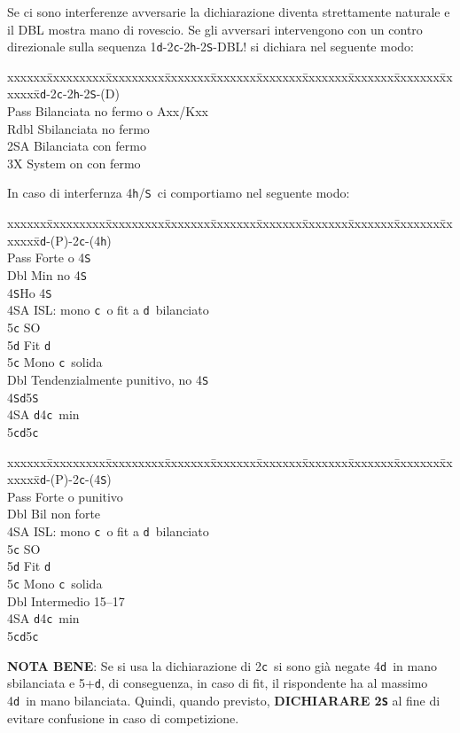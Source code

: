 \documentclass[a4paper,italian]{article}
\newcommand{\BS}{\small{\texttt{S}}}
\newcommand{\BC}{\small{\texttt{c}}}
\newcommand{\BD}{\small{\texttt{d}}}
\newcommand{\BH}{\small{\texttt{h}}}
\newenvironment{bidtable}
{\begin{tabbing}

    xxxxxx\=xxxxxxxxx\=xxxxxxxxx\=xxxxxxx\=xxxxxxx\=xxxxxxx\=xxxxxxx\=xxxxxxx\=xxxxxxx\=xxxxxxx\=\kill}
{\end{tabbing} }%
\newenvironment{attenzione}[1]
{\begin{tcolorbox}[colframe=red!80!white,title=#1]}
    {
\end{tcolorbox} }%
\begin{document}
\bigbreak
\begin{attenzione}{Interferenze}
    Se ci sono interferenze avversarie la dichiarazione diventa strettamente naturale e il DBL mostra mano di rovescio. Se gli avversari intervengono con un contro direzionale sulla sequenza 1\BD -2\BC -2\BH -2\BS -DBL! si dichiara nel seguente modo:
    \bigbreak
    \begin{bidtable}
        1\BD-2\BC-2\BH-2\BS-(D)\+\\
        Pass \> Bilanciata no fermo o Axx/Kxx\\
        Rdbl \> Sbilanciata no fermo\\
        2\small{SA} \> Bilanciata con fermo\\
        3X \> System on con fermo\-
    \end{bidtable}
    \smallbreak
    In caso di interfernza 4\BH /\BS\ ci comportiamo nel seguente modo:
    \smallbreak
    \begin{bidtable}
        1\BD-(P)-2\BC-(4\BH)\+\\
        Pass \> Forte o 4\BS\+\\
        Dbl\> Min no 4\BS\\
        4\BS\>Ho 4\BS\\
        4\small{SA} \>ISL: mono \BC\ o fit a \BD\ bilanciato\+\\
        5\BC\> SO\+\\
        5\BD\> Fit \BD\-\-\\
        5\BC\> Mono \BC\ solida\-\\
        Dbl \> Tendenzialmente punitivo, no 4\BS \\
        4\BS {}\BD 5\BS \\
        4\small{SA} \BD4\BC\ min\\
        5\BC {}\BD5\BC
    \end{bidtable}
    \smallbreak
    \begin{bidtable}
        1\BD-(P)-2\BC-(4\BS)\+\\
        Pass \> Forte o punitivo\+\\
        Dbl\> Bil non forte\\
        4\small{SA}\> ISL: mono \BC\ o fit a \BD\ bilanciato\+\\
        5\BC\> SO\+\\
        5\BD\> Fit \BD\-\-\\
        5\BC\> Mono \BC\ solida\-\\
        Dbl \> Intermedio 15--17\\
        4\small{SA} \BD4\BC\ min\\
        5\BC {}\BD5\BC\\
    \end{bidtable}

    \textbf{NOTA BENE}: Se si usa la dichiarazione di 2\BC\ si sono già negate 4\BD\ in mano sbilanciata e 5+\BD, di conseguenza, in caso di fit, il rispondente ha al massimo 4\BD\ in mano bilanciata. Quindi, quando previsto, \textbf{DICHIARARE 2\BS} al fine di evitare confusione in caso di competizione.
\end{attenzione}
\end{document}

